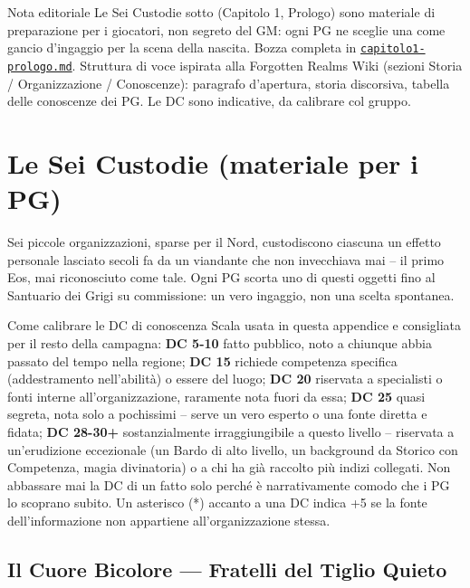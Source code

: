 \begin{DndComment}[]{Nota editoriale}
  Le Sei Custodie sotto (Capitolo 1, Prologo) sono materiale di preparazione per i giocatori, non segreto del GM: ogni PG ne sceglie una come gancio d'ingaggio per la scena della nascita. Bozza completa in \href{https://github.com/fpetrulio/child-of-balance/blob/main/docs/01-campaign-design/capitolo1-prologo.md}{\texttt{capitolo1-prologo.md}}. Struttura di voce ispirata alla Forgotten Realms Wiki (sezioni Storia / Organizzazione / Conoscenze): paragrafo d'apertura, storia discorsiva, tabella delle conoscenze dei PG. Le DC sono indicative, da calibrare col gruppo.
\end{DndComment}

\section{Le Sei Custodie (materiale per i PG)}

Sei piccole organizzazioni, sparse per il Nord, custodiscono ciascuna un effetto personale lasciato secoli fa da un viandante che non invecchiava mai -- il primo Eos, mai riconosciuto come tale. Ogni PG scorta uno di questi oggetti fino al Santuario dei Grigi su commissione: un vero ingaggio, non una scelta spontanea.

\begin{DndSidebar}[float=!b]{Come calibrare le DC di conoscenza}
  Scala usata in questa appendice e consigliata per il resto della campagna: \textbf{DC 5-10} fatto pubblico, noto a chiunque abbia passato del tempo nella regione; \textbf{DC 15} richiede competenza specifica (addestramento nell'abilità) o essere del luogo; \textbf{DC 20} riservata a specialisti o fonti interne all'organizzazione, raramente nota fuori da essa; \textbf{DC 25} quasi segreta, nota solo a pochissimi -- serve un vero esperto o una fonte diretta e fidata; \textbf{DC 28-30+} sostanzialmente irraggiungibile a questo livello -- riservata a un'erudizione eccezionale (un Bardo di alto livello, un background da Storico con Competenza, magia divinatoria) o a chi ha già raccolto più indizi collegati. Non abbassare mai la DC di un fatto solo perché è narrativamente comodo che i PG lo scoprano subito. Un asterisco (*) accanto a una DC indica +5 se la fonte dell'informazione non appartiene all'organizzazione stessa.
\end{DndSidebar}

\subsection{Il Cuore Bicolore --- Fratelli del Tiglio Quieto}

